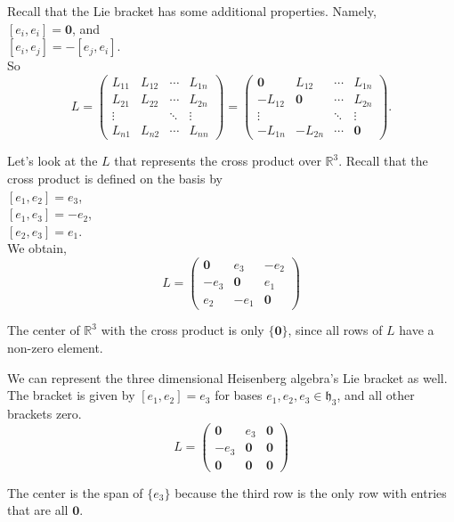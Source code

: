 \documentclass[11 pt]{article}
\newcommand{\br}[2]{\left[#1,#2\right]}
\newcommand{\h}{\lal{h}}
\newcommand{\lal}[1]{\mathfrak{#1}}
\newcommand{\zvec}{\mathbf{0}}
\newcommand{\RR}{\mathbb{R}}
\begin{document}
    Recall that the Lie bracket has some additional properties.  Namely,
    \\$[e_i,e_i] = \zvec$, and
    \\$[e_i, e_j] = -[e_j, e_i]$.
    \\So
    $$
     L = \begin{pmatrix}
        L_{11} & L_{12} & \cdots & L_{1n} \\
        L_{21} & L_{22} & \cdots & L_{2n} \\
        \vdots &        & \ddots & \vdots \\
        L_{n1} & L_{n2} & \cdots & L_{nn}
    \end{pmatrix}
    = \begin{pmatrix}
               \zvec& L_{12}  & \cdots & L_{1n} \\
               -L_{12}& \zvec & \cdots & L_{2n} \\
               \vdots &       & \ddots & \vdots \\
               -L_{1n}&-L_{2n}& \cdots & \zvec
        \end{pmatrix}.
    $$
    \pagebreak
    \begin{example}
    Let's look at the $L$ that represents the cross product over $\RR^3$.
    Recall that the cross product is defined on the basis by
        \\$\br{e_1}{e_2}=e_3$,
        \\$\br{e_1}{e_3}=-e_2$,
        \\$\br{e_2}{e_3}=e_1$.
        \\We obtain,
        $$
        L = \begin{pmatrix}
              \zvec & e_3   & -e_2
            \\-e_3  & \zvec & e_1
            \\e_2   & -e_1  & \zvec
        \end{pmatrix}
    $$
    \end{example}
    The center of $\RR^3$ with the cross product is only $\{\zvec\}$, since all
    rows of $L$ have a non-zero element.
    \begin{example}
    We can represent the three dimensional Heisenberg algebra's Lie bracket as
    well. The bracket is given by $\br{e_1}{e_2}=e_3$ for bases
    $e_1, e_2, e_3 \in \h_3$, and all other
        brackets zero.
    $$
    L = \begin{pmatrix}
          \zvec & e_3   & \zvec
        \\-e_3  & \zvec & \zvec
        \\\zvec & \zvec & \zvec
    \end{pmatrix}
    $$
    \end{example}
    The center is the span of $\{e_3\}$ because the third row is the only row
    with entries that are all $\zvec$.
\end{document}
